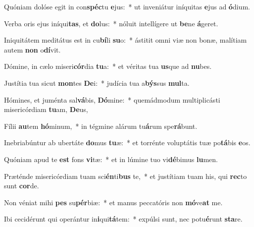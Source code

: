 \item Quóniam dolóse egit in con\textbf{spéc}tu \textbf{e}jus:~* ut inveniátur iníquitas \textbf{e}jus ad \textbf{ó}dium.
\item Verba oris ejus iníqui\textbf{tas}, et \textbf{do}lus:~* nóluit intellígere ut \textbf{be}ne \textbf{á}geret.
\item Iniquitátem meditátus est in cu\textbf{bí}li \textbf{su}o:~* ástitit omni viæ non bonæ, malítiam autem \textbf{non} o\textbf{dí}vit.
\item Dómine, in cælo miseri\textbf{cór}dia \textbf{tu}a:~* et véritas tua \textbf{us}que ad \textbf{nu}bes.
\item Justítia tua sicut \textbf{mon}tes \textbf{De}i:~* judícia tua a\textbf{býs}sus \textbf{mul}ta.
\item Hómines, et juménta sal\textbf{vá}bis, \textbf{Dó}mine:~* quemádmodum multiplicásti misericórdiam \textbf{tu}am, \textbf{De}us,
\item Fílii \textbf{au}tem \textbf{hó}minum,~* in tégmine alárum tu\textbf{á}rum spe\textbf{rá}bunt.
\item Inebriabúntur ab ubertáte \textbf{do}mus \textbf{tu}æ:~* et torrénte voluptátis tuæ po\textbf{tá}bis \textbf{e}os.
\item Quóniam apud te \textbf{est} fons \textbf{vi}tæ:~* et in lúmine tuo vi\textbf{dé}bimus \textbf{lu}men.
\item Præténde misericórdiam tuam sci\textbf{én}ti\textbf{bus} te,~* et justítiam tuam his, qui \textbf{rec}to sunt \textbf{cor}de.
\item Non véniat mihi \textbf{pes} su\textbf{pér}biæ:~* et manus peccatóris non \textbf{mó}ve\textbf{at} me.
\item Ibi cecidérunt qui operántur in\textbf{i}qui\textbf{tá}tem:~* expúlsi sunt, nec potu\textbf{é}runt \textbf{sta}re.
